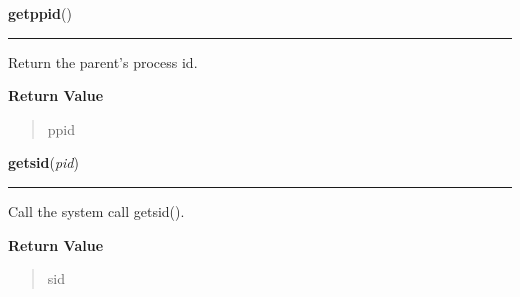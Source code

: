     \label{os:getppid}

    \vspace{0.5ex}

\hspace{.8\funcindent}\begin{boxedminipage}{\funcwidth}

    \raggedright \textbf{getppid}()

    \vspace{-1.5ex}

    \rule{\textwidth}{0.5\fboxrule}
\setlength{\parskip}{2ex}
    Return the parent's process id.

\setlength{\parskip}{1ex}
      \textbf{Return Value}
    \vspace{-1ex}

      \begin{quote}
      ppid

      \end{quote}

    \end{boxedminipage}

    \label{os:getsid}

    \vspace{0.5ex}

\hspace{.8\funcindent}\begin{boxedminipage}{\funcwidth}

    \raggedright \textbf{getsid}(\textit{pid})

    \vspace{-1.5ex}

    \rule{\textwidth}{0.5\fboxrule}
\setlength{\parskip}{2ex}
    Call the system call getsid().

\setlength{\parskip}{1ex}
      \textbf{Return Value}
    \vspace{-1ex}

      \begin{quote}
      sid

      \end{quote}

    \end{boxedminipage}

    \label{os:getuid}

    \vspace{0.5ex}

